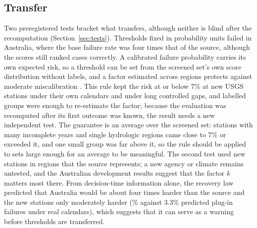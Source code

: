 \documentclass[draft]{agujournal2025}
\begin{document}
\subsection{Transfer}
Two preregistered tests bracket what transfers, although neither is blind after the recomputation (Section~\ref{sec:tests}). Thresholds fixed in probability units failed in Australia, where the base failure rate was four times that of the source, although the scores still ranked cases correctly. A calibrated failure probability carries its own expected risk, so a threshold can be set from the screened set's own score distribution without labels, and a factor estimated across regions protects against moderate miscalibration \cite{chow1970,franc2023}. This rule kept the risk at or below 7\% at new USGS stations under their own calendars and under long controlled gaps, and \TNewLocalGroups{} labelled groups were enough to re-estimate the factor; because the evaluation was recomputed after its first outcome was known, the result needs a new independent test. The guarantee is an average over the screened set: stations with many incomplete years and single hydrologic regions came close to 7\% or exceeded it, and one small group was far above it, so the rule should be applied to sets large enough for an average to be meaningful. The second test used new stations in regions that the source represents; a new agency or climate remains untested, and the Australian development results suggest that the factor $k$ matters most there. From decision-time information alone, the recovery law predicted that Australia would be about four times harder than the source and the new stations only moderately harder (\TNewLawPredicted\% against 3.3\% predicted plug-in failures under real calendars), which suggests that it can serve as a warning before thresholds are transferred.
\end{document}
